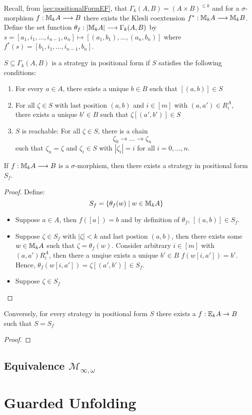 Recall, from \ref{sec:positionalFormEF}, that $\Gamma_{k}(A,B) = (A \times B)^{\leq k}$ and for a $\sigma$-morphism $f:{\mathbb{M}_{k}A} \longrightarrow B$ there exists the Klesli coextension $f^{*}:{\mathbb{M}_{k}A} \longrightarrow {\mathbb{M}_{k}B}$. Define the set function $\theta_{f}:|{\mathbb{M}_{k}A}| \longrightarrow \Gamma_{k}(A,B)$ by $s = [a_{1},i_{1},\dots,i_{n-1},a_{n}] \mapsto [(a_{1},b_{1}),\dots,(a_{n},b_{n})]$ where $f^{*}(s) = [b_{1},i_{1},\dots,i_{n-1},b_{n}]$. 
\begin{defn}
$S \subseteq \Gamma_{k}(A,B)$ is a strategy in positional form if $S$ satisfies the following conditions:
\begin{enumerate}[label=(S\arabic*),ref=S\arabic*,start=0]
\item For every $a \in A$, there exists a unique $b \in B$ such that $[(a,b)] \in S$ \label{eq:S1st}
\item For all $\zeta \in S$ with last position $(a,b)$ and $i \in [m]$ with $(a,a') \in R_{i}^{A}$, there exists a unique $b' \in B$ such that $\zeta[(a',b')] \in S$ \label{eq:S2nd}
\item $S$ is reachable: For all $\zeta \in S$, there is a chain \label{eq:S3rd}
$$\zeta_{0} \longrightarrow \dots \longrightarrow \zeta_{n}$$
such that $\zeta_{n} = \zeta$ and $\zeta_{i} \in S$ with $|\zeta_{i}| = i$ for all $i = 0,\dots,n$. 
\end{enumerate}
\end{defn}
\begin{prop}
If $f:{\mathbb{M}_{k}A} \longrightarrow B$ is a $\sigma$-morphism, then there exists a strategy in positional form $S_{f}$.
\begin{proof}
Define: 
$$S_{f} = \{\theta_{f}(w) \mid w \in {\mathbb{M}_{k}A}\}$$
\begin{itemize}
\item Suppose $a \in A$, then $f([a]) = b$ and by definition of $\theta_{f}$, $[(a,b)] \in S_{f}$. 
\item Suppose $\zeta \in S_{f}$ with $|\zeta| < k$ and last postion $(a,b)$, then there exists some $w \in {\mathbb{M}_{k}A}$ such that $\zeta = \theta_{f}(w)$. Consider arbitrary $i \in [m]$ with $(a,a') R_{i}^{A}$, then there a unqiue exists a unique $b' \in B$ $f(w[i,a']) = b'$. Hence, $\theta_{f}(w[i,a']) = \zeta[(a',b')] \in S_{f}$.
\item Suppose $\zeta \in S_{f}$
\end{itemize}
\end{proof}
\label{prop:fToPosFormM}
\end{prop}
\begin{prop}
Conversely, for every strategy in positional form $S$ there exists a $f:{\mathbb{E}_{k}A} \rightarrow B$ such that $S = S_{f}$
\begin{proof}
\end{proof}
\label{prop:posFormToFM}
\end{prop}
\subsection{Equivalence $\mathcal{M}_{\infty,\omega}$}
\section{Guarded Unfolding}
